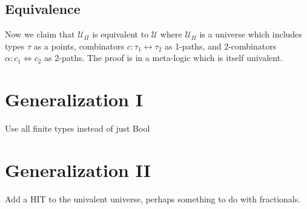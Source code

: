 \documentclass[format=acmlarge,review,natbib]{acmart}
\newcommand{\iso}{\leftrightarrow}
\newcommand{\isotwo}{\Leftrightarrow}
\begin{document}
\subsection{Equivalence}

Now we claim that $\mathcal{U}_\Pi$ is equivalent to $\mathcal{U}$ where
$\mathcal{U}_\Pi$ is a universe which includes types $\tau$ as a points,
combinators $c : \tau_1 \iso \tau_2$ as 1-paths, and 2-combinators $\alpha : c_1
\isotwo c_2$ as 2-paths. The proof is in a meta-logic which is itself univalent.

\section{Generalization I}

Use all finite types instead of just Bool

\section{Generalization II}

Add a HIT to the univalent universe, perhaps something to do with fractionals.



{\footnotesize

}
\end{document}
